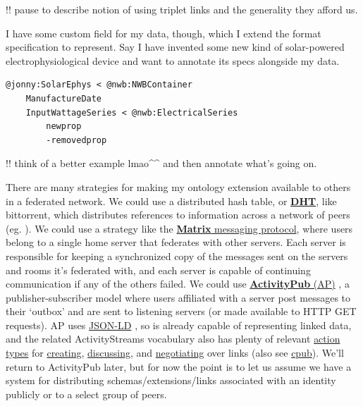 \documentclass[notoc]{tufte-book}
\begin{document}
!! pause to describe notion of using triplet links and the generality
they afford us.

I have some custom field for my data, though, which I extend the format
specification to represent. Say I have invented some new kind of
solar-powered electrophysiological device and want to annotate its specs
alongside my data.

\begin{verbatim}
@jonny:SolarEphys < @nwb:NWBContainer
    ManufactureDate
    InputWattageSeries < @nwb:ElectricalSeries
        newprop
        -removedprop
\end{verbatim}

!! think of a better example lmao\^{}\^{} and then annotate what's going
on.

There are many strategies for making my ontology extension available to
others in a federated network. We could use a distributed hash table, or
\href{https://en.wikipedia.org/wiki/Distributed_hash_table}{\textbf{DHT}},
like bittorrent, which distributes references to information across a
network of peers (eg. \citep{pirroDHTbasedSemanticOverlay2012} ).
We could use a strategy like the
\href{https://matrix.org/}{\textbf{Matrix} messaging protocol}, where
users belong to a single home server that federates with other servers.
Each server is responsible for keeping a synchronized copy of the
messages sent on the servers and rooms it's federated with, and each
server is capable of continuing communication if any of the others
failed. We could use
\href{https://www.w3.org/TR/2018/REC-activitypub-20180123/}{\textbf{ActivityPub}
(AP)} \citep{Webber:18:A} , a publisher-subscriber model where
users affiliated with a server post messages to their `outbox' and are
sent to listening servers (or made available to HTTP GET requests). AP
uses \href{https://json-ld.org/}{JSON-LD} \citep{spornyJSONLDJSONbasedSerialization2020} , so is already capable of
representing linked data, and the related ActivityStreams vocabulary
\citep{snellActivityStreams2017}  also has plenty of relevant
\href{https://www.w3.org/TR/activitystreams-vocabulary/\#activity-types}{action
types} for
\href{https://www.w3.org/TR/activitystreams-vocabulary/\#dfn-create}{creating},
\href{https://www.w3.org/TR/activitystreams-vocabulary/\#dfn-question}{discussing},
and
\href{https://www.w3.org/TR/activitystreams-vocabulary/\#dfn-tentativeaccept}{negotiating}
over links (also see
\href{https://github.com/openEngiadina/cpub}{cpub}). We'll return to
ActivityPub later, but for now the point is to let us assume we have a
system for distributing schemas/extensions/links associated with an
identity publicly or to a select group of peers.
\end{document}
